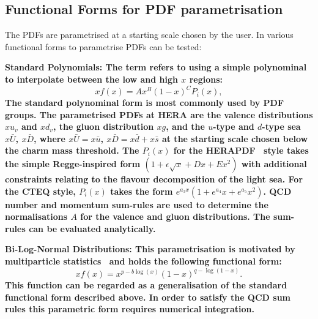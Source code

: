 \subsection{Functional Forms for PDF parametrisation}
The PDFs are parametrised at a starting scale chosen by the user. In \fitter various functional forms to parametrise PDFs can be tested:
\begin{description}
\item \bf {Standard Polynomials:} \rm
The term refers to using a simple polynominal to interpolate between the low and high $x$ regions:
\begin{equation}
 xf(x) = A x^{B} (1-x)^{C} P_i(x),
\label{eqn:pdf_std}
\end{equation}
The standard polynominal form is most commonly used by PDF groups.
The parametrised PDFs at HERA are the valence distributions
$xu_v$ and $xd_v$, the gluon distribution $xg$, and the $u$-type and $d$-type sea 
$x\bar{U}$, $x\bar{D}$, where $x\bar{U} = x\bar{u}$, 
$x\bar{D} = x\bar{d} +x\bar{s}$ at the starting scale chosen below the charm mass threshold. 
The $P_i(x)$ for the HERAPDF~\cite{h1zeus:2009wt} style takes the simple Regge-inspired form  
$(1 + \epsilon \sqrt{x} + D x + E x^2)$
with additional constraints relating to the flavour decomposition of the 
light sea. 
For the CTEQ style, $P_i(x)$ takes the form $e^{a_3x} (1 + e^{a_4} x + e^{a_5} x^2)$.
QCD number and momentum sum-rules are used to determine the normalisations $A$ for the valence and gluon distributions. 
The sum-rules can be evaluated analytically.

\item \bf {Bi-Log-Normal Distributions:} \rm
This parametrisation is motivated by  multiparticle statistics~\cite{hera-lhc:report2009}
and holds the following functional form:
\begin{equation}
 xf(x)=x^{p-b\log(x)}(1-x)^{q-\log(1-x)}.
\end{equation}
This function can be regarded as a generalisation of the standard functional form described above. 
In order to satisfy the QCD sum rules this parametric form requires numerical integration.


\end{description}
